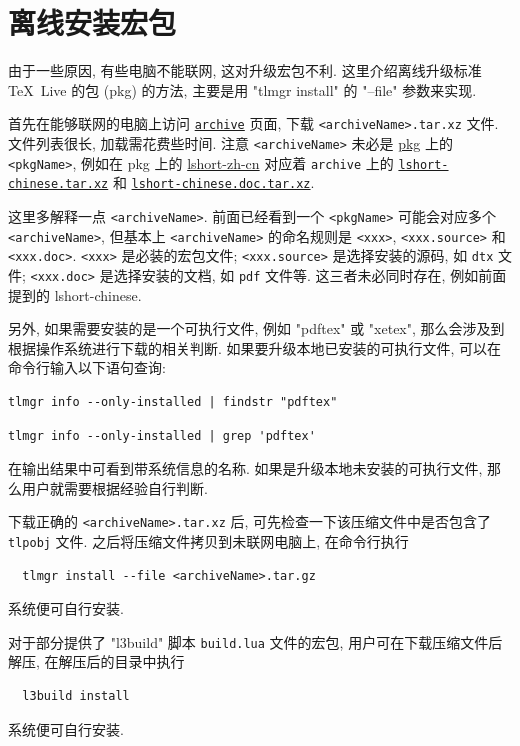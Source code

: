 
\chapter{离线安装宏包}

由于一些原因,
有些电脑不能联网,
这对升级宏包不利.
这里介绍离线升级标准 \TeX~Live 的包 (pkg) 的方法,
主要是用 "tlmgr install" 的 "--file" 参数来实现.

首先在能够联网的电脑上访问
\href{https://ctan.org/tex-archive/systems/texlive/tlnet/archive}{\texttt{archive}}
页面, 下载 \texttt{<archiveName>.tar.xz} 文件.
文件列表很长, 加载需花费些时间.
注意 \texttt{<archiveName>} 未必是
\href{https://ctan.org/pkg/}{\textsf{pkg}} 上的 \texttt{<pkgName>},
例如在 \textsf{pkg} 上的
\href{https://ctan.org/pkg/lshort-zh-cn}{\textsf{lshort-zh-cn}}
对应着 \texttt{archive} 上的
\href{http://mirrors.ctan.org/systems/texlive/tlnet/archive/lshort-chinese.tar.xz}{\texttt{lshort-chinese.tar.xz}}
和
\href{http://mirrors.ctan.org/systems/texlive/tlnet/archive/lshort-chinese.doc.tar.xz}{\texttt{lshort-chinese.doc.tar.xz}}.

这里多解释一点 \texttt{<archiveName>}.
前面已经看到一个 \texttt{<pkgName>} 可能会对应多个 \texttt{<archiveName>},
但基本上 \texttt{<archiveName>} 的命名规则是 \texttt{<xxx>},
\texttt{<xxx.source>} 和 \texttt{<xxx.doc>}.
\texttt{<xxx>} 是必装的宏包文件;
\texttt{<xxx.source>} 是选择安装的源码, 如 \texttt{dtx} 文件;
\texttt{<xxx.doc>} 是选择安装的文档, 如 \texttt{pdf} 文件等.
这三者未必同时存在, 例如前面提到的 \textsf{lshort-chinese}.

另外, 如果需要安装的是一个可执行文件, 例如 "pdftex" 或 "xetex",
那么会涉及到根据操作系统进行下载的相关判断.
如果要升级本地已安装的可执行文件, 可以在命令行输入以下语句查询:
\begin{lstlisting}[title = \small\sffamily Windows 系统]
  tlmgr info --only-installed | findstr "pdftex"
\end{lstlisting}
\begin{lstlisting}[title = \small\sffamily Ubuntu 和 macOS]
  tlmgr info --only-installed | grep 'pdftex'
\end{lstlisting}
在输出结果中可看到带系统信息的名称.
如果是升级本地未安装的可执行文件,
那么用户就需要根据经验自行判断.

下载正确的 \texttt{<archiveName>.tar.xz} 后,
可先检查一下该压缩文件中是否包含了 \texttt{tlpobj} 文件.
之后将压缩文件拷贝到未联网电脑上,
在命令行执行
\begin{lstlisting}
  tlmgr install --file <archiveName>.tar.gz
\end{lstlisting}
系统便可自行安装.

对于部分提供了 "l3build" 脚本 \texttt{build.lua} 文件的宏包,
用户可在下载压缩文件后解压, 在解压后的目录中执行
\begin{lstlisting}
  l3build install
\end{lstlisting}
系统便可自行安装.
